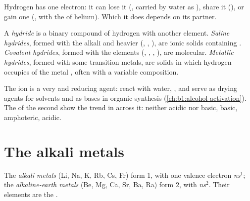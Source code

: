 Hydrogen has one electron: it can lose it (, carried by water as
), share it (), or gain one (, with the
 of helium). Which it does depends on its partner.

\begin{definition}[Hydrides]\label{def:b1:s-block:hydride}
A \emph{hydride} is a binary compound of hydrogen with
another element. \emph{Saline hydrides}, formed
with the alkali and heavier  (, ,
), are ionic solids containing . \emph{Covalent
hydrides}, formed with the  elements
(, , , ), are molecular. \emph{Metallic
hydrides}, formed with some transition metals,
are solids in which hydrogen occupies  of the metal
, often with a variable composition.
\end{definition}

The  ion is a very  and reducing agent: 
react with water, , and serve as drying agents
for solvents and as bases in organic synthesis (\cref{ch:b1:alcohol-activation}).
The  of the second  show the trend in
 across it:  neither acidic nor basic, 
basic,  amphoteric,  acidic.

\section{The alkali metals}

\begin{definition}\label{def:b1:s-block:families}
The \emph{alkali metals} (Li, Na, K, Rb, Cs, Fr) form
 1, with one valence electron \textit{ns}$^1$; the
\emph{alkaline-earth metals} (Be, Mg, Ca, Sr,
Ba, Ra) form  2, with \textit{ns}$^2$. Their elements are the
.
\end{definition}

